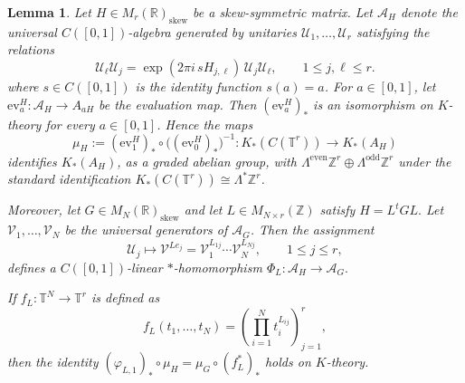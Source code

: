 \documentclass[11pt]{amsart}
\newtheorem{lemma}[theorem]{Lemma}
\theoremstyle{definition}
\theoremstyle{remark}
\newcommand{\T}{\mathbb{T}}
\newcommand{\Z}{\mathbb{Z}}
\newcommand{\R}{\mathbb{R}}
\newcommand{\ev}{\mathrm{ev}}
\begin{document}
\begin{lemma}
\label{lem:toric-PV-naturality}
Let $H\in M_r(\R)_{\mathrm{skew}}$ be a skew-symmetric matrix. Let $\mathcal A_H$ denote the universal
$C([0,1])$-algebra generated by unitaries $\mathcal U_1,\ldots,\mathcal U_r$
satisfying the relations
\begin{equation}\label{eq:com1}
\mathcal U_\ell \mathcal U_j
=
\exp(2\pi i\,sH_{j,\ell})\,\mathcal U_j\mathcal U_\ell,
\qquad 1\leq j,\ell\leq r.
\end{equation} where $s\in C([0,1])$ is the identity function $s(a)=a$. 
For $a\in[0,1]$, let $\ev_a^H\colon \mathcal A_H\longrightarrow A_{aH}$
be the evaluation map. Then $(\ev_a^H)_*$ is an isomorphism on $K$-theory for
every $a\in[0,1]$. Hence the maps
\[
\mu_H
:=
(\ev_1^H)_*\circ\bigl((\ev_0^H)_*\bigr)^{-1}
\colon
K_*(C(\T^r))\longrightarrow K_*(A_H)
\]
identifies $K_*(A_H)$, as a graded abelian group, with $\Lambda^{\mathrm{even}}\Z^r\oplus \Lambda^{\mathrm{odd}}\Z^r$
under the standard identification $K_*(C(\T^r))\cong \Lambda^*\Z^r$.

Moreover, let $G\in M_N(\R)_{\mathrm{skew}}$ and let
$L\in M_{N\times r}(\Z)$ satisfy $H=L^tGL.$
Let $\mathcal V_1,\ldots,\mathcal V_N$ be the universal generators of
$\mathcal A_G$. Then the assignment
\[
\mathcal U_j\longmapsto \mathcal V^{Le_j}
=
\mathcal V_1^{L_{1j}}\cdots \mathcal V_N^{L_{Nj}},
\qquad 1\leq j\leq r,
\]
defines a $C([0,1])$-linear $*$-homomorphism $\Phi_L\colon \mathcal A_H\longrightarrow \mathcal A_G.$

If $f_L\colon \T^N\to \T^r$ is defined as
\[
f_L(t_1,\ldots,t_N)
=
\left(\prod_{i=1}^N t_i^{L_{ij}}\right)_{j=1}^r,
\]
then the identity $
(\varphi_{L,1})_*\circ \mu_H=\mu_G\circ (f_L^*)_*$ holds on $K$-theory.
\end{lemma}
\end{document}

